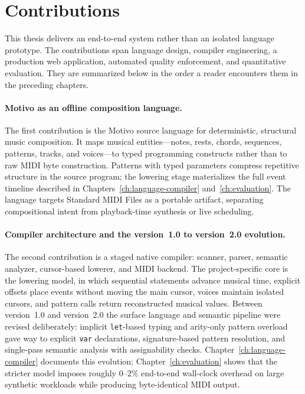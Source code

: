 \section{Contributions}\label{sec:contributions}

This thesis delivers an end-to-end system rather than an isolated language prototype.
The contributions span language design, compiler engineering, a production web application, automated quality
enforcement, and quantitative evaluation.
They are summarized below in the order a reader encounters them in the preceding chapters.

\paragraph{Motivo as an offline composition language.}
The first contribution is the Motivo source language for deterministic, structural music composition.
It maps musical entities---notes, rests, chords, sequences, patterns, tracks, and voices---to typed programming
constructs rather than to raw MIDI byte construction.
Patterns with typed parameters compress repetitive structure in the source program; the lowering stage materializes the
full event timeline described in Chapters~\ref{ch:language-compiler} and~\ref{ch:evaluation}.
The language targets Standard MIDI Files as a portable artifact, separating compositional intent from playback-time
synthesis or live scheduling.

\paragraph{Compiler architecture and the version~1.0 to version~2.0 evolution.}
The second contribution is a staged native compiler: scanner, parser, semantic analyzer, cursor-based lowerer, and
MIDI backend.
The project-specific core is the lowering model, in which sequential statements advance musical time, explicit offsets
place events without moving the main cursor, voices maintain isolated cursors, and pattern calls return reconstructed
musical values.
Between version~1.0 and version~2.0 the surface language and semantic pipeline were revised deliberately: implicit
\texttt{let}-based typing and arity-only pattern overload gave way to explicit \texttt{var} declarations,
signature-based
pattern resolution, and single-pass semantic analysis with assignability checks.
Chapter~\ref{ch:language-compiler} documents this evolution; Chapter~\ref{ch:evaluation} shows that the stricter model
imposes roughly $0$--$2\%$ end-to-end wall-clock overhead on large synthetic workloads while producing byte-identical
MIDI output.

